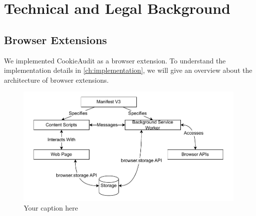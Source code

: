 \chapter{Technical and Legal Background}

\section{Browser Extensions}
We implemented CookieAudit as a browser extension.
To understand the implementation details in \cref{ch:implementation}, we will give an overview about the architecture of browser extensions.

\begin{figure}[h]
    \centering
    \includegraphics[width=\textwidth]{media/browser-extension-architecture.drawio.pdf}
    \caption{Your caption here}
    \label{fig:your-label}
\end{figure}